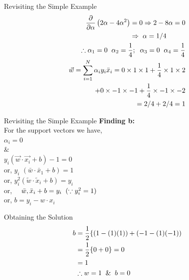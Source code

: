 \documentclass{beamer}
\begin{document}
\begin{frame}{Revisiting the Simple Example}
\begin{align*}
\begin{aligned}
\frac{\partial}{\partial \alpha}\left(2 \alpha-4 \alpha^{2}\right)=0 & \Rightarrow 2-8 \alpha=0 \\
\Rightarrow \hspace{2mm}& \alpha=1 / 4 \\
\end{aligned}\\
\therefore \alpha_{1}=0 \hspace{2mm} \alpha_{2}=\frac{1}{4} ; \hspace{2mm} \alpha_{3}=0 \hspace{2mm} \alpha_{4}=\frac{1}{4}
\\
\vec{w}=\sum_{i=1}^{N} \alpha_{i} y_{i} \bar{x}_{i} =0 \times 1 \times 1+\frac{1}{4} \times 1 \times 2 \\
+ 0 \times -1 \times -1 + \frac{1}{4}\times -1 \times -2 \\
 = 2/4 + 2/4 = 1
\end{align*}
\end{frame}

\begin{frame}{Revisiting the Simple Example}
\textbf{Finding b:}\\
For the support vectors we have, \\
$\alpha_{i}=0$\\
$\&$\\
$y_{i}(\vec{w} \cdot \overrightarrow{x_{i}}+b)-1=0$\\
or, $y_{i}$ $\left(\bar{w} \cdot \bar{x}_{1}+b\right)=1$\\
or, $y_{i}^{2}\left(\tilde{w} \cdot \tilde{x}_{i}+b\right)=y_{i}$\\
or, $\quad \bar{w}, \bar{x}_{i}+b=y_{i} \hspace{2mm}(\because y_{i}^{2} = 1)$\\
or, $b= y_i - w \cdot x_i$

\end{frame}

\begin{frame}{Obtaining the Solution}
\begin{align*}
\begin{aligned}
b &=\frac{1}{2}\{(1-(1)(1))+(-1-(1)(-1))\\
&=\frac{1}{2}\{0+0\}=0 \\
&=1 \\
& \therefore w = 1 \hspace{2mm}\& \hspace{2mm} b = 0
\end{aligned}
\end{align*}
\end{frame}
\end{document}
